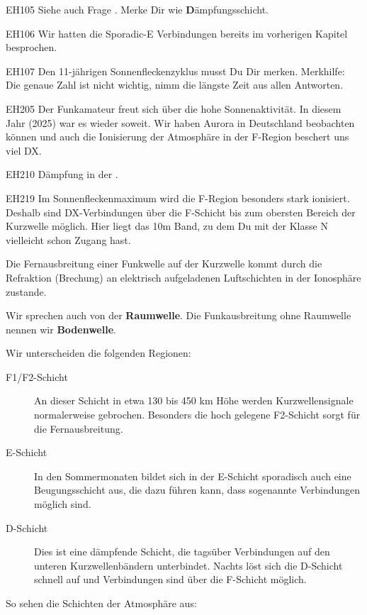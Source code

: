 \begin{sol}{EH105}
Siehe auch Frage . Merke Dir  wie \textbf{D}ämpfungsschicht.
\end{sol}

\begin{sol}{EH106}
Wir hatten die Sporadic-E Verbindungen bereits im vorherigen Kapitel besprochen.
\end{sol}

\begin{sol}{EH107}
Den 11-jährigen Sonnenfleckenzyklus musst Du Dir merken. Merkhilfe: Die genaue Zahl ist nicht wichtig, nimm die längste Zeit aus allen Antworten.
\end{sol}

\begin{sol}{EH205}
Der Funkamateur freut sich über die hohe Sonnenaktivität. In diesem Jahr (2025) war es wieder soweit. Wir haben Aurora in Deutschland beobachten können und auch die Ionisierung der Atmosphäre in der F-Region beschert uns viel DX.
\end{sol}

\begin{sol}{EH210}
Dämpfung in der .
\end{sol}

\begin{sol}{EH219}
Im Sonnenfleckenmaximum wird die F-Region besonders stark ionisiert. Deshalb sind DX-Verbindungen über die F-Schicht bis zum obersten Bereich der Kurzwelle möglich. Hier liegt das 10m Band, zu dem Du mit der Klasse N vielleicht schon Zugang hast.
\end{sol}

\begin{ohmchapter}
Die Fernausbreitung einer Funkwelle auf der Kurzwelle kommt durch die Refraktion (Brechung) an elektrisch aufgeladenen Luftschichten in der Ionosphäre zustande.

Wir sprechen auch von der \textbf{Raumwelle}. Die Funkausbreitung ohne Raumwelle nennen wir \textbf{Bodenwelle}.

Wir unterscheiden die folgenden Regionen:
\begin{description}
    \item[F1/F2-Schicht] An dieser Schicht in etwa 130 bis 450 km Höhe werden Kurzwellensignale normalerweise gebrochen. Besonders die hoch gelegene F2-Schicht sorgt für die Fernausbreitung.
    \item[E-Schicht] In den Sommermonaten bildet sich in der E-Schicht sporadisch auch eine Beugungsschicht aus, die dazu führen kann, dass sogenannte  Verbindungen möglich sind.
    \item[D-Schicht] Dies ist eine dämpfende Schicht, die tagsüber Verbindungen auf den unteren Kurzwellenbändern unterbindet. Nachts löst sich die D-Schicht schnell auf und Verbindungen sind über die F-Schicht möglich. 
\end{description}
So sehen die Schichten der Atmosphäre aus:
   
\end{ohmchapter}  

